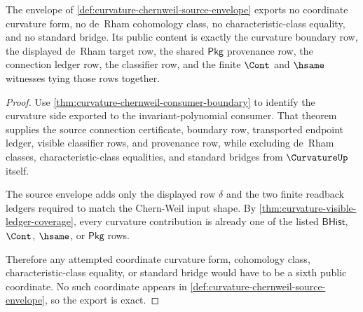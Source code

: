 \begin{theorem}
\label{thm:curvature-chernweil-source-envelope-exactness}
The envelope of \autoref{def:curvature-chernweil-source-envelope} exports no coordinate curvature form, no de~Rham cohomology class, no characteristic-class equality, and no standard bridge. Its public content is exactly the curvature boundary row, the displayed de~Rham target row, the shared $\mathsf{Pkg}$ provenance row, the connection ledger row, the classifier row, and the finite $\Cont$ and $\hsame$ witnesses tying those rows together.
\end{theorem}
\begin{proof}
Use \autoref{thm:curvature-chernweil-consumer-boundary} to identify the curvature side exported to the invariant-polynomial consumer. That theorem supplies the source connection certificate, boundary row, transported endpoint ledger, visible classifier rows, and provenance row, while excluding de~Rham classes, characteristic-class equalities, and standard bridges from $\CurvatureUp$ itself.

The source envelope adds only the displayed row $\delta$ and the two finite readback ledgers required to match the Chern-Weil input shape. By \autoref{thm:curvature-visible-ledger-coverage}, every curvature contribution is already one of the listed $\mathsf{BHist}$, $\Cont$, $\hsame$, or $\mathsf{Pkg}$ rows.

Therefore any attempted coordinate curvature form, cohomology class, characteristic-class equality, or standard bridge would have to be a sixth public coordinate. No such coordinate appears in \autoref{def:curvature-chernweil-source-envelope}, so the export is exact.
\end{proof}

